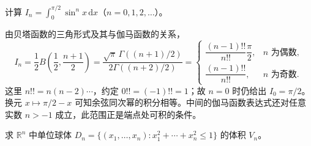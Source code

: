 \begin{example}
\label{ex:beta-sine-power-integrals}
计算 $\displaystyle I_n=\int_0^{\pi/2}\sin^n x\,\mathrm{d}x$（$n=0,1,2,\ldots$）。
\end{example}

\begin{solve}
由贝塔函数的三角形式及其与伽马函数的关系，
\begin{equation}
    I_n=\frac12B\left(\frac12,\frac{n+1}{2}\right)
       =\frac{\sqrt\pi\,\Gamma((n+1)/2)}{2\Gamma((n+2)/2)}
       =\begin{cases}
           \dfrac{(n-1)!!}{n!!}\dfrac\pi2,&n\text{ 为偶数},\\
           \dfrac{(n-1)!!}{n!!},&n\text{ 为奇数}.
         \end{cases}
    \label{eq:beta-sine-power-integrals}
\end{equation}
这里 $n!!=n(n-2)\cdots$，约定 $0!!=(-1)!!=1$；故 $n=0$ 时仍给出 $I_0=\pi/2$。换元 $x\mapsto\pi/2-x$ 可知余弦同次幂的积分相等。中间的伽马函数表达式还对任意实数 $n>-1$ 成立，此范围正是端点处可积的条件。
\end{solve}

\begin{example}
\label{ex:gamma-unit-ball-volume}
求 $\mathbb R^n$ 中单位球体 $D_n=\{(x_1,\ldots,x_n):x_1^2+\cdots+x_n^2\leq1\}$ 的体积 $V_n$。
\end{example}

